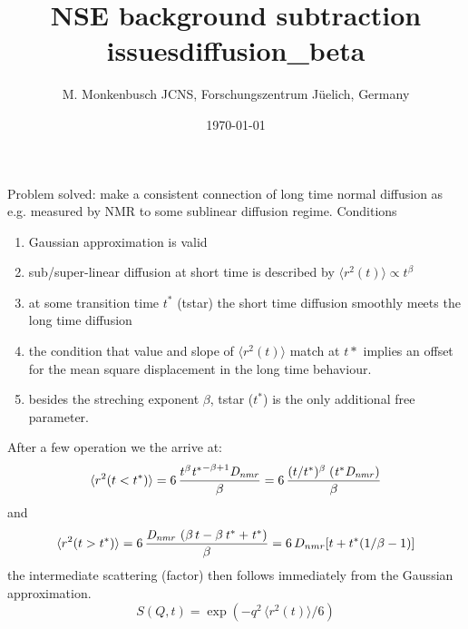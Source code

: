 \documentclass[12pt]{article}
\title{NSE background subtraction issues}
\author{M. Monkenbusch 
JCNS, Forschungszentrum J\"uelich, Germany}
\date{\today}
\newcommand{\myspace}{\vskip 0.4cm}
\begin{document}
\title{diffusion\_beta}
%
Problem solved:
make a consistent connection of long time normal diffusion as e.g. measured by NMR to
some sublinear diffusion regime.
\myspace
Conditions
\begin{enumerate}
\item Gaussian approximation is valid
\item sub/super-linear diffusion at short time is described by $\langle r^2(t) \rangle \propto t^\beta$
\item at some transition time $t^*$ (tstar) the short time diffusion smoothly meets the long time diffusion
\item the condition that value and slope of  $\langle r^2(t) \rangle$ match at $t*$ implies an offset for
the mean square displacement in the long time behaviour.
\item besides the streching exponent $\beta$, tstar ($t^*$) is the only additional free parameter.
\end{enumerate}

After a few operation we the arrive at:
\begin{equation}
\label{eq:difbeta1}
 \langle r^2(t<t^*) \rangle = 6\,{\frac {{t}^{\beta}{{\it t^*}}^{-\beta+1}{\it D_{nmr}}}{\beta}} =
                              6\,{\frac {(t/t^*)^{\beta}\;({{\it t^*}}{\it D_{nmr})}}{\beta}}
\end{equation}
and
\begin{equation}
\label{eq:difbeta2}
 \langle r^2(t>t^*) \rangle = 6\,{\frac {{\it D_{nmr}}\, \left( \beta\,t-\beta\,{\it t^*}+{\it t^*}
 \right) }{\beta}}
= 
6\,D_{nmr}[t + t^* (1/\beta -1)] 
\end{equation}
the intermediate scattering (factor) then follows immediately from the Gaussian approximation.
\begin{equation}
S(Q,t) = \exp(-q^2 \,  \langle r^2(t) \rangle /6)
\end{equation}
\end{document}
